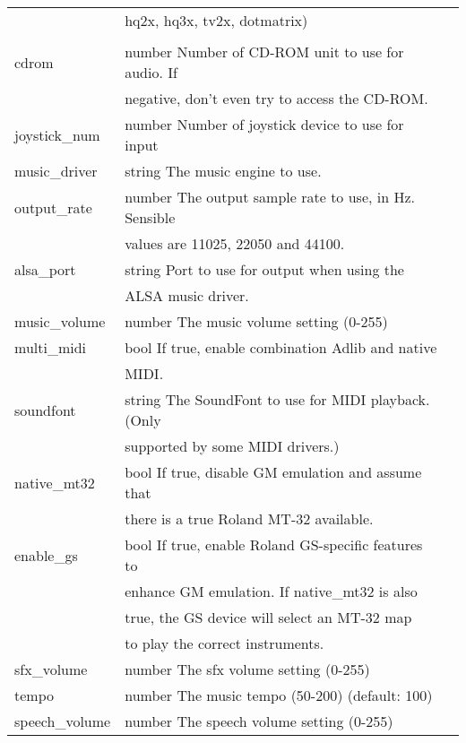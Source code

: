 \begin{tabular}[hf]{lll}
                       &         hq2x, hq3x, tv2x, dotmatrix)\\
\\
        cdrom           &number   Number of CD-ROM unit to use for audio. If\\
                        &         negative, don't even try to access the CD-ROM.\\
        joystick\_num   &number   Number of joystick device to use for input\\
        music\_driver   &string   The music engine to use.\\
        output\_rate    &number   The output sample rate to use, in Hz. Sensible\\
                        &         values are 11025, 22050 and 44100.\\
        alsa\_port      &string   Port to use for output when using the\\
                        &         ALSA music driver.\\
        music\_volume   &number   The music volume setting (0-255)\\
        multi\_midi     &bool     If true, enable combination Adlib and native\\
                        &         MIDI.\\
        soundfont       &string   The SoundFont to use for MIDI playback. (Only\\
                        &         supported by some MIDI drivers.)\\
        native\_mt32    &bool     If true, disable GM emulation and assume that\\
                        &         there is a true Roland MT-32 available.\\
	   enable\_gs      &bool     If true, enable Roland GS-specific features to\\
                        &         enhance GM emulation. If native\_mt32 is also\\
                        &         true, the GS device will select an MT-32 map\\
                        &         to play the correct instruments.\\
        sfx\_volume     &number   The sfx volume setting (0-255)\\
        tempo           &number   The music tempo (50-200) (default: 100)\\
        speech\_volume  &number   The speech volume setting (0-255)\\

\end{tabular}
